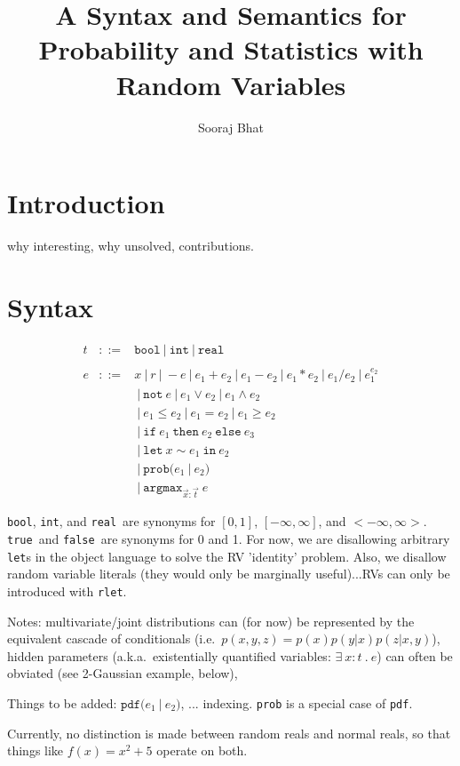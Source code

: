 \documentclass{article}
\title{A Syntax and Semantics for\\Probability and Statistics with Random Variables}
\author{Sooraj Bhat}
\newcommand{\E}[1]{\ensuremath{#1}}
\newcommand{\T}[1]{\texttt{#1}}
\newcommand{\rbool}{\T{bool}}
\newcommand{\rint}{\T{int}}
\newcommand{\rreal}{\T{real}}
\newcommand{\true}{\T{true}}
\newcommand{\false}{\T{false}}
\newcommand{\rlet}[3]{\E{\T{let}\ #1 \sim #2 \ \T{in}\ #3}}
\newcommand{\pdf}[2]{\E{\T{pdf(} #1 \ | \ #2 \T{)}}}
\newcommand{\prob}[2]{\E{\T{prob(} #1 \ | \ #2 \T{)}}}
\newcommand{\thereis}[3]{\E{\exists\ #1 : #2 \ . \ #3}}
\newcommand{\Not}{\T{not}}
\newcommand{\argmax}[2]{\E{\T{argmax}_{#1}\ #2}}
\newcommand{\ite}[3]{\E{\T{if}\ #1\ \T{then}\ #2\ \T{else}\ #3}}
\begin{document}
\maketitle
\section{Introduction}
%
why interesting, why unsolved, contributions.
%
\section{Syntax}
% 
\begin{eqnarray*}
t & ::= & \rbool \ | \ \rint \ | \ \rreal \\ %
& & \\
e & ::= & x \ | \ r 
    \ | \ -e \ | \ e_1 + e_2 \ | \ e_1 - e_2 
    \ | \ e_1 * e_2 \ | \ e_1 / e_2 \ | \ e_1^{e_2} \\
& & \ | \ \Not\ e \ | \ e_1 \vee e_2 \ | \ e_1 \wedge e_2 \\
& & \ | \ e_1 \leq e_2 \ | \ e_1 = e_2 \ | \ e_1 \geq e_2 \\
& & \ | \ \ite{e_1}{e_2}{e_3} \\
& & \ | \ \rlet{x}{e_1}{e_2} \\
& & \ | \ \prob{e_1}{e_2} \\
& & \ | \ \argmax{\vec{x}:\vec{t}}{e}
\end{eqnarray*}

\rbool, \rint, and \rreal\ are synonyms for $[0,1]$,
$[-\infty,\infty]$, and $<-\infty,\infty>$. \true\ and \false\ are
synonyms for 0 and 1.  For now, we are disallowing arbitrary {\tt
let}s in the object language to solve the RV 'identity' problem.
Also, we disallow random variable literals (they would only be
marginally useful)...RVs can only be introduced with \T{rlet}.

Notes: multivariate/joint distributions can (for now) be represented
by the equivalent cascade of conditionals (i.e.\ $p(x,y,z) =
p(x)p(y|x)p(z|x,y)$), hidden parameters (a.k.a.\ existentially
quantified variables: \thereis{x}{t}{e}) can often be obviated (see
2-Gaussian example, below),

Things to be added: \pdf{e_1}{e_2}, ... indexing. \T{prob} is a
special case of \T{pdf}.

Currently, no distinction is made between random reals and normal
reals, so that things like $f(x) = x^2 + 5$ operate on both.
\end{document}
